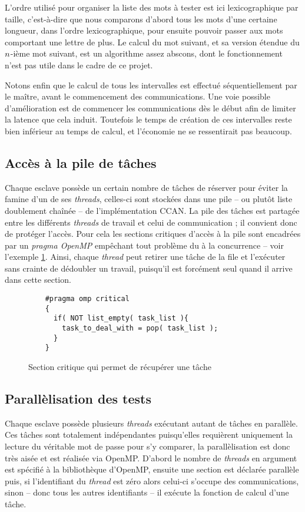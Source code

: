 L'ordre utilisé pour organiser la liste des mots à tester est ici lexicographique par taille, c'est-à-dire que nous comparons d'abord tous les mots d'une certaine longueur, dans l'ordre lexicographique, pour ensuite pouvoir passer aux mots comportant une lettre de plus. Le calcul du mot suivant, et sa version étendue du $\mathnormal{n}$-ième mot suivant, est un algorithme assez abscons, dont le fonctionnement n'est pas utile dans le cadre de ce projet.

Notons enfin que le calcul de tous les intervalles est effectué séquentiellement par le maître, avant le commencement des communications. Une voie possible d'amélioration est de commencer les communications dès le début afin de limiter la latence que cela induit. Toutefois le temps de création de ces intervalles reste bien inférieur au temps de calcul, et l'économie ne se ressentirait pas beaucoup.

\subsection{Accès à la pile de tâches}

Chaque esclave possède un certain nombre de tâches de réserver pour éviter la famine d'un de ses \emph{threads}, celles-ci sont stockées dans une pile -- ou plutôt liste doublement chaînée -- de l'implémentation \textsf{CCAN}. La pile des tâches est partagée entre les différents \emph{threads} de travail et celui de communication ; il convient donc de protéger l'accès. Pour cela les sections critiques d'accès à la pile sont encadrées par un \emph{pragma OpenMP} empêchant tout problème du à la concurrence -- voir l'exemple \ref{critical}. Ainsi, chaque \emph{thread} peut retirer une tâche de la file et l'exécuter sans crainte de dédoubler un travail, puisqu'il est forcément seul quand il arrive dans cette section. 

\begin{figure}
\begin{lstlisting}
	#pragma omp critical
	{
	  if( NOT list_empty( task_list ){
	    task_to_deal_with = pop( task_list );
	  }
	}
\end{lstlisting}
\caption{Section critique qui permet de récupérer une tâche}
\label{critical}
\end{figure}

\subsection{Parallèlisation des tests}

Chaque esclave possède plusieurs \emph{threads} exécutant autant de tâches en parallèle. Ces tâches sont totalement indépendantes puisqu'elles requièrent uniquement la lecture du véritable mot de passe pour s'y comparer, la parallèlisation est donc très aisée et est réalisée via \textsf{OpenMP}. D'abord le nombre de \emph{threads} en argument est spécifié à la bibliothèque d'\textsf{OpenMP}, ensuite une section est déclarée parallèle puis, si l'identifiant du \emph{thread} est zéro alors celui-ci s'occupe des communications, sinon -- donc tous les autres identifiants -- il exécute la fonction de calcul d'une tâche.
